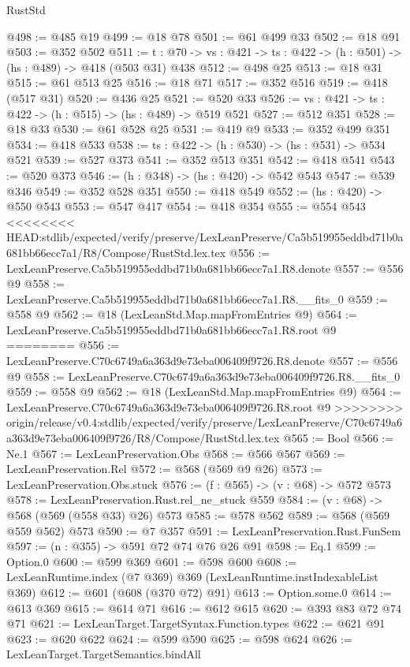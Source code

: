\begin{lexlean}{RustStd}
\begin{coremodule}
{\begin{coremodule}
@498 := @485 @19
@499 := @18 @78
@501 := @61 @499 @33
@502 := @18 @91
@503 := @352 @502
@511 := {t : @70} -> {vs : @421} -> {ts : @422} -> (h : @501) -> (hs : @489) -> @418 (@503 @31) @438
@512 := @498 @25
@513 := @18 @31
@515 := @61 @513 @25
@516 := @18 @71
@517 := @352 @516
@519 := @418 (@517 @31)
@520 := @436 @25
@521 := @520 @33
@526 := {vs : @421} -> {ts : @422} -> (h : @515) -> (hs : @489) -> @519 @521
@527 := @512 @351
@528 := @18 @33
@530 := @61 @528 @25
@531 := @419 @9
@533 := @352 @499 @351
@534 := @418 @533
@538 := {ts : @422} -> (h : @530) -> (hs : @531) -> @534 @521
@539 := @527 @373
@541 := @352 @513 @351
@542 := @418 @541
@543 := @520 @373
@546 := (h : @348) -> (hs : @420) -> @542 @543
@547 := @539 @346
@549 := @352 @528 @351
@550 := @418 @549
@552 := (hs : @420) -> @550 @543
@553 := @547 @417
@554 := @418 @354
@555 := @554 @543
<<<<<<<< HEAD:stdlib/expected/verify/preserve/LexLeanPreserve/Ca5b519955eddbd71b0a681bb66ecc7a1/R8/Compose/RustStd.lex.tex
@556 := LexLeanPreserve.Ca5b519955eddbd71b0a681bb66ecc7a1.R8.denote
@557 := @556 @9
@558 := LexLeanPreserve.Ca5b519955eddbd71b0a681bb66ecc7a1.R8.__fits_0
@559 := @558 @9
@562 := @18 (LexLeanStd.Map.mapFromEntries @9)
@564 := LexLeanPreserve.Ca5b519955eddbd71b0a681bb66ecc7a1.R8.root @9
========
@556 := LexLeanPreserve.C70c6749a6a363d9e73eba006409f9726.R8.denote
@557 := @556 @9
@558 := LexLeanPreserve.C70c6749a6a363d9e73eba006409f9726.R8.__fits_0
@559 := @558 @9
@562 := @18 (LexLeanStd.Map.mapFromEntries @9)
@564 := LexLeanPreserve.C70c6749a6a363d9e73eba006409f9726.R8.root @9
>>>>>>>> origin/release/v0.4:stdlib/expected/verify/preserve/LexLeanPreserve/C70c6749a6a363d9e73eba006409f9726/R8/Compose/RustStd.lex.tex
@565 := Bool
@566 := Ne.{1}
@567 := LexLeanPreservation.Obs
@568 := @566 @567
@569 := LexLeanPreservation.Rel
@572 := @568 (@569 @9 @26)
@573 := LexLeanPreservation.Obs.stuck
@576 := (f : @565) -> (v : @68) -> @572 @573
@578 := LexLeanPreservation.Rust.rel_ne_stuck @559
@584 := (v : @68) -> @568 (@569 (@558 @33) @26) @573
@585 := @578 @562
@589 := @568 (@569 @559 @562) @573
@590 := @7 @357
@591 := LexLeanPreservation.Rust.FunSem
@597 := (n : @355) -> @591 @72 @74 @76 @26 @91
@598 := Eq.{1}
@599 := Option.{0}
@600 := @599 @369
@601 := @598 @600
@608 := LexLeanRuntime.index (@7 @369) @369 (LexLeanRuntime.instIndexableList @369)
@612 := @601 (@608 (@370 @72) @91)
@613 := Option.some.{0}
@614 := @613 @369
@615 := @614 @71
@616 := @612 @615
@620 := @393 @83 @72 @74 @71
@621 := LexLeanTarget.TargetSyntax.Function.types
@622 := @621 @91
@623 := @620 @622
@624 := @599 @590
@625 := @598 @624
@626 := LexLeanTarget.TargetSemantics.bindAll

\end{coremodule}}
\end{coremodule}
\end{lexlean}
